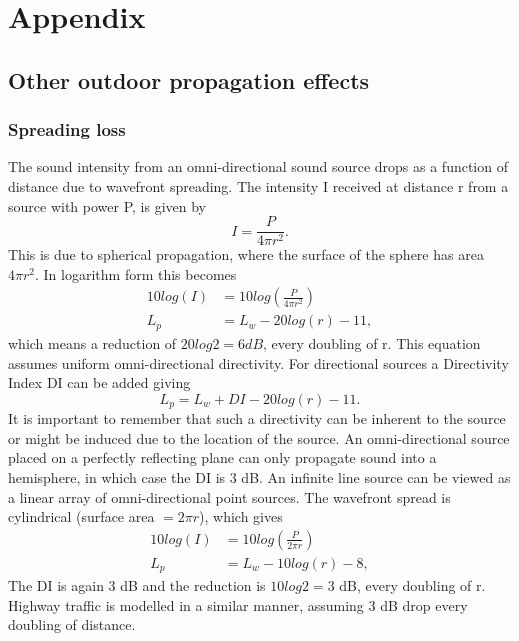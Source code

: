 \section{Appendix}



\subsection{Other outdoor propagation effects}
\subsubsection{Spreading loss} 
The sound intensity from an omni-directional sound source drops as a function of distance due to wavefront spreading. The intensity I received at distance r from a source with power P, is given by
\begin{equation}
    I = \frac{P}{4\pi r^2}.
\end{equation}
This is due to spherical propagation, where the surface of the sphere has area $4\pi r^2$. In logarithm form this becomes
\begin{equation}
\begin{split}
    10log(I) &= 10log(\frac{P}{4\pi r^2}) \\
    L_p &= L_w - 20 log(r) - 11,
\end{split}
\end{equation}
which means a reduction of $20log2 = 6 dB$, every doubling of r. This equation assumes uniform omni-directional directivity. For directional sources a Directivity Index DI can be added giving
\begin{equation}
    L_p = L_w + DI - 20 log(r) - 11.
\end{equation}
It is important to remember that such a directivity can be inherent to the source or might be induced due to the location of the source. An omni-directional source placed on a perfectly reflecting plane can only propagate sound into a hemisphere, in which case the DI is 3 dB.  
An infinite line source can be viewed as a linear array of omni-directional point sources. The wavefront spread is cylindrical (surface area $= 2\pi r$),  which gives
\begin{equation}
\begin{split}
    10log(I) &= 10log(\frac{P}{2\pi r}) \\
    L_p &= L_w - 10 log(r) - 8,
\end{split}
\end{equation}
The DI is again 3 dB and the reduction is $10log2 = 3$ dB, every doubling of r. Highway traffic is modelled in a similar manner, assuming 3 dB drop every doubling of distance.

